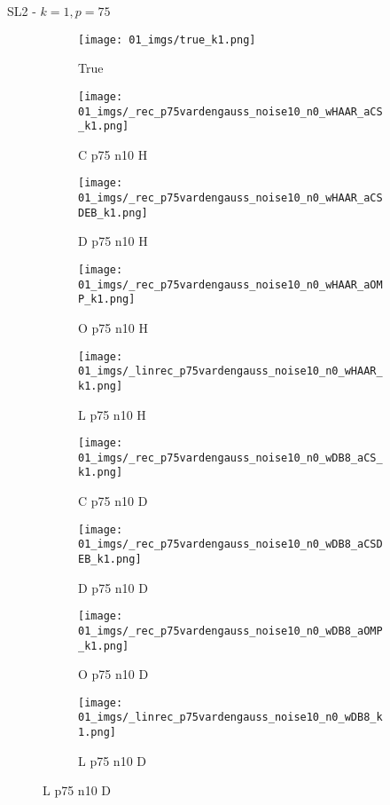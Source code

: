 \begin{frame}{SL2 - $k=1,p=75$}{}
\begin{figure}
\begin{subfigure}{0.1\textwidth}
\texttt{[image: 01\_imgs/true\_k1.png]}
\caption*{\Tiny True}
\end{subfigure}
\begin{subfigure}{0.1\textwidth}
\texttt{[image: 01\_imgs/\_rec\_p75vardengauss\_noise10\_n0\_wHAAR\_aCS\_k1.png]}
\caption*{\Tiny C p75 n10 H}
\end{subfigure}
\begin{subfigure}{0.1\textwidth}
\texttt{[image: 01\_imgs/\_rec\_p75vardengauss\_noise10\_n0\_wHAAR\_aCSDEB\_k1.png]}
\caption*{\Tiny D p75 n10 H}
\end{subfigure}
\begin{subfigure}{0.1\textwidth}
\texttt{[image: 01\_imgs/\_rec\_p75vardengauss\_noise10\_n0\_wHAAR\_aOMP\_k1.png]}
\caption*{\Tiny O p75 n10 H}
\end{subfigure}
\begin{subfigure}{0.1\textwidth}
\texttt{[image: 01\_imgs/\_linrec\_p75vardengauss\_noise10\_n0\_wHAAR\_k1.png]}
\caption*{\Tiny L p75 n10 H}
\end{subfigure}
\begin{subfigure}{0.1\textwidth}
\texttt{[image: 01\_imgs/\_rec\_p75vardengauss\_noise10\_n0\_wDB8\_aCS\_k1.png]}
\caption*{\Tiny C p75 n10 D}
\end{subfigure}
\begin{subfigure}{0.1\textwidth}
\texttt{[image: 01\_imgs/\_rec\_p75vardengauss\_noise10\_n0\_wDB8\_aCSDEB\_k1.png]}
\caption*{\Tiny D p75 n10 D}
\end{subfigure}
\begin{subfigure}{0.1\textwidth}
\texttt{[image: 01\_imgs/\_rec\_p75vardengauss\_noise10\_n0\_wDB8\_aOMP\_k1.png]}
\caption*{\Tiny O p75 n10 D}
\end{subfigure}
\begin{subfigure}{0.1\textwidth}
\texttt{[image: 01\_imgs/\_linrec\_p75vardengauss\_noise10\_n0\_wDB8\_k1.png]}
\caption*{\Tiny L p75 n10 D}
\end{subfigure}

\vspace{5pt}


\end{figure}
\end{frame}
